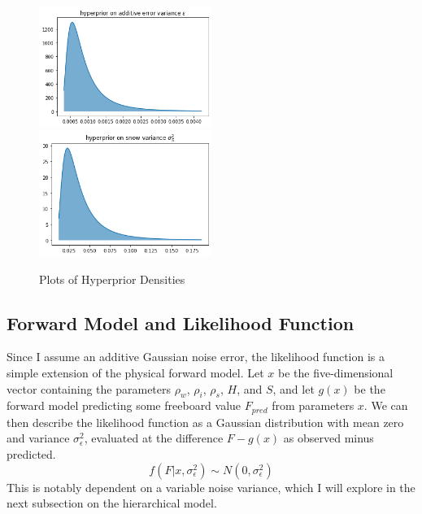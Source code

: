 \documentclass[12pt, letterpaper]{article}
\begin{document}
\begin{figure}[h]
\caption{Plots of Hyperprior Densities}
\includegraphics[width=0.5\textwidth]{hypprior_var_eps.png}
\includegraphics[width=0.5\textwidth]{hypprior_var_S.png}
\end{figure}

\newpage
\subsection{Forward Model and Likelihood Function}
Since I assume an additive Gaussian noise error, the likelihood function is a simple extension of the physical forward model.
Let $x$ be the five-dimensional vector containing the parameters $\rho_w$, $\rho_i$, $\rho_s$, $H$, and $S$,
and let $g(x)$ be the forward model predicting some freeboard value $F_{pred}$ from parameters $x$.
We can then describe the likelihood function as a Gaussian distribution with mean zero and variance $ \sigma^2_\epsilon$,
evaluated at the difference $F - g(x)$ as observed minus predicted.
\[
    f(F | x, \sigma^2_\epsilon) \sim N(0, \sigma^2_\epsilon)
\]
This is notably dependent on a variable noise variance, which I will explore in the next subsection on the hierarchical model.
\end{document}
